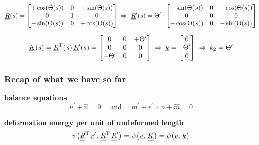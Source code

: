 \begin{frame}
  \vspace{-2em}
  \begin{displaymath}
    \underline{\underline{R}}(s) =
    \begin{bmatrix}
      +\cos(\Theta(s)) & 0 & +\sin(\Theta(s))\\
      0 & 1 & 0 \\
      -\sin(\Theta(s)) & 0 & +\cos(\Theta(s))
    \end{bmatrix}
    \: \Rightarrow \:
    \underline{\underline{R}}^{\prime}(s) =
    \Theta^{\prime} \cdot
    \begin{bmatrix}
      -\sin(\Theta(s)) & 0 & +\cos(\Theta(s))\\
      0 & 0 & 0 \\
      -\cos(\Theta(s)) & 0 & -\sin(\Theta(s))
    \end{bmatrix}
  \end{displaymath}
  
  \begin{displaymath}
    \underline{\underline{K}}(s) =
    \underline{\underline{R}}^{\mathrm{T}}(s) \, \underline{\underline{R}}^{\prime}(s) =
    \begin{bmatrix}
      0 & 0 & +\Theta^{\prime} \\
      0 & 0 & 0 \\
      -\Theta^{\prime} & 0 & 0
    \end{bmatrix}
    \: \Rightarrow \:
    \underline{k} =
    \begin{bmatrix}
      0 \\ \Theta^{\prime} \\ 0
    \end{bmatrix}
    \: \Rightarrow \:
    k_2 = \Theta^{\prime}
  \end{displaymath}
\end{frame}

\begin{frame}
  \frametitle{Recap of what we have so far}
  \textbf{balance equations}
  \begin{displaymath}
    \underline{n}^{\prime} + \underline{\hat{n}} = \underline{0}
    \quad \text{ and } \quad
    \underline{m}^{\prime} + \underline{r}^{\prime} \times \underline{n} + \underline{\hat{m}} = \underline{0}
  \end{displaymath}
  
  \vspace{2em}
  \textbf{deformation energy per unit of undeformed length}
  \begin{displaymath}
    \psi \bigl( \underline{\underline{R}}^{\mathrm{T}} \, \underline{r}^{\prime} , \, \underline{\underline{R}}^{\mathrm{T}} \, \underline{\underline{R}}^{\prime} \bigr) =
    \psi \bigl( \underline{v} , \, \underline{\underline{K}} \bigr) =
    \psi \bigl( \underline{v} , \, \underline{k} \bigr)  \end{displaymath}
\end{frame}



